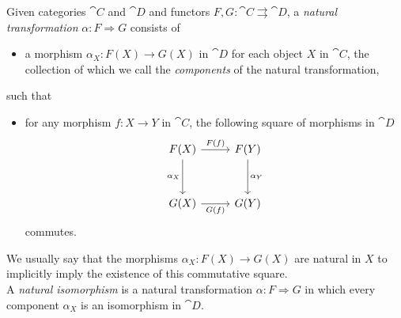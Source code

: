 \begin{definition}\label{natrans}
Given categories $\cat{C}$ and $\cat{D}$ and functors $F,G: \cat{C} \rightrightarrows \cat{D}$, a \emph{natural transformation} $\alpha: F \Rightarrow G$ consists of
\begin{itemize}
\item a morphism $\alpha_X : F(X) \to G(X)$ in $\cat{D}$ for each object $X$ in $\cat{C}$, the collection of which we call the \emph{components} of the natural transformation,
\end{itemize}
such that
\begin{itemize}
\item for any morphism $f : X \to Y$ in $\cat{C}$, the following square of morphisms in $\cat{D}$
\[\begin{tikzcd}[row sep=large]
F(X) \arrow[r, "F(f)"] \arrow[d, "\alpha_X"'] &[0.2em] F(Y) \arrow[d, "\alpha_Y"]\\[0.5em]
G(X)                    \arrow[r, "G(f)"']                                &                   G(Y)
\end{tikzcd}\]
commutes.
\end{itemize}
We usually say that the morphisms $\alpha_X : F(X) \to G(X)$ are natural in $X$ to implicitly imply the existence of this commutative square.\\[0.5em]
A \emph{natural isomorphism} is a natural transformation $\alpha: F \Rightarrow G$ in which every component $\alpha_X$ is an isomorphism in $\cat{D}$.
\end{definition}

\vspace{0.1in}

